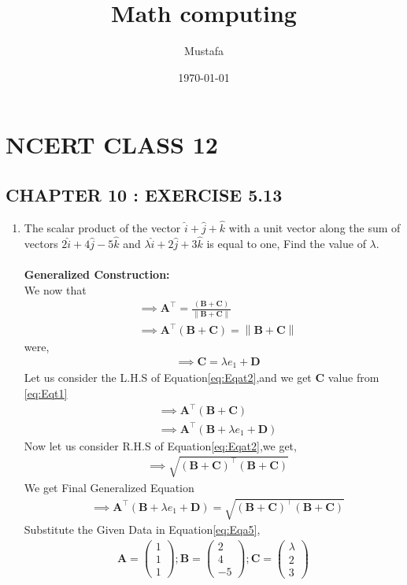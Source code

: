 \documentclass[11pt, a4paper]{article}
\title{ Math computing}
\author{ Mustafa}
\date{\today}
\newcommand{\myvec}[1]{\ensuremath{\begin{pmatrix}#1\end{pmatrix}}}
\let\vec\mathbf
\providecommand{\brak}[1]{\ensuremath{\left(#1\right)}}
\providecommand{\norm}[1]{\left\lVert#1\right\rVert}
\begin{document}
\section*{NCERT CLASS 12}
\subsection*{CHAPTER 10 : EXERCISE 5.13}
\begin{enumerate}
\item\textbf{}The scalar product of the vector $\hat{i}+\hat{j}+\hat{k}$ with a unit vector along the sum of vectors $2\hat{i}+4\hat{j}-5\hat{k}$ and $\lambda\hat{i}+2\hat{j}+3\hat{k}$ is equal to one, Find the value of $\lambda$.
\\\\
\textbf{Generalized Construction:}\\
We now that \\
\begin{align}
   &\implies \vec{A}^\top = \frac{\brak{\vec{B}+\vec{C}}}{\norm{\vec{B}+\vec{C}}}\\
       &\implies \vec{A}^\top \brak{\vec{B}+\vec{C}}=\norm{\vec{B}+\vec{C}} \label{eq:Eqat2}
    \end{align}
    were,\\
    \begin{align}
        & \implies \vec{C}=\lambda e_1+\vec{D}\label{eq:Eqt1}
    \end{align}
Let us consider the L.H.S of Equation\eqref{eq:Eqat2},and we get $\vec{C}$ value from \eqref{eq:Eqt1}
\begin{align}
    &\implies \vec{A}^\top \brak{\vec{B}+\vec{C}}\\
   &\implies \vec{A}^\top \brak{\vec{B}+\lambda e_1+\vec{D}}
\end{align}
Now let us consider R.H.S of Equation\eqref{eq:Eqat2},we get,
\begin{align}
    &\implies \sqrt{\brak{\vec{B}+\vec{C}}^\top\brak{\vec{B}+\vec{C}}}
\end{align}
We get Final Generalized Equation
\begin{align}
   &\implies \vec{A}^\top \brak{\vec{B}+\lambda e_1+\vec{D}}=\sqrt{\brak{\vec{B}+\vec{C}}^\top\brak{\vec{B}+\vec{C}}}
   \label{eq:Eqa5}
\end{align}
Substitute the Given Data in Equation\eqref{eq:Eqa5},
\begin{align*}
\vec{A}=\myvec{1\\1\\1};\vec{B}=\myvec{2\\4\\-5};\vec{C}=\myvec{\lambda\\2\\3}

\end{align*}
\end{enumerate}
\end{document}
